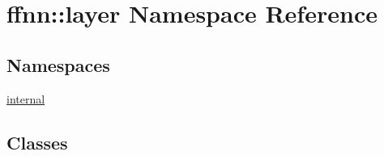 \hypertarget{namespaceffnn_1_1layer}{\section{ffnn\-:\-:layer Namespace Reference}
\label{namespaceffnn_1_1layer}
}
\subsection*{Namespaces}
\begin{DoxyCompactItemize}
\item 
\hyperlink{namespaceffnn_1_1layer_1_1internal}{internal}
\end{DoxyCompactItemize}
\subsection*{Classes}
